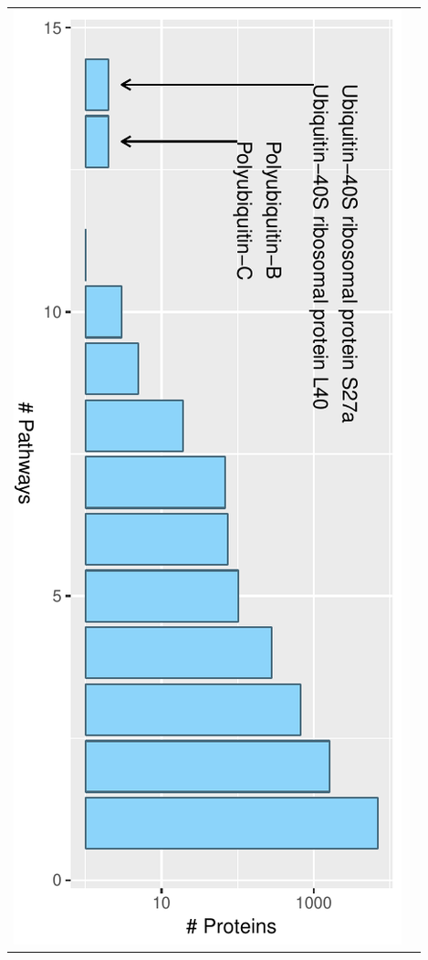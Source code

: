 \documentclass{article}
\begin{document}
\begin{tabular}{l@{}l}
  \includegraphics[scale=0.58]{Figure4b.pdf}\\
\end{tabular}
\end{document}
